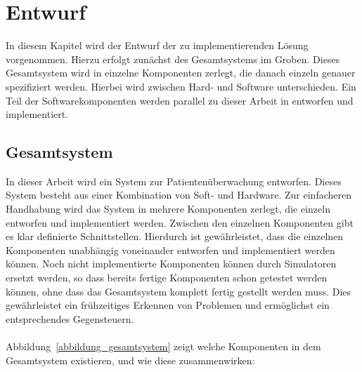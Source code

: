 

\chapter{Entwurf}\label{Entwurf}

In diesem Kapitel wird der Entwurf der zu implementierenden Lösung vorgenommen. Hierzu erfolgt zunächst des Gesamtsystems
im Groben. Dieses Gesamtsystem wird in einzelne Komponenten zerlegt, die danach einzeln genauer spezifiziert werden.
Hierbei wird zwischen Hard- und Software unterschieden. Ein Teil der Softwarekomponenten werden parallel zu dieser 
Arbeit in \cite{Jan} entworfen und implementiert.

\section{Gesamtsystem}
In dieser Arbeit wird ein System zur Patientenüberwachung entworfen. Dieses System besteht aus einer Kombination
von Soft- und Hardware. Zur einfacheren Handhabung wird das System in mehrere Komponenten zerlegt, die einzeln entworfen
und implementiert werden. Zwischen den einzelnen Komponenten gibt es klar definierte Schnittstellen. Hierdurch ist
gewährleistet, dass die einzelnen Komponenten unabhängig voneinander entworfen und implementiert werden können. Noch nicht
implementierte Komponenten können durch Simulatoren ersetzt werden, so dass bereits fertige Komponenten schon getestet
werden können, ohne dass das Gesamtsystem komplett fertig gestellt werden muss. Dies gewährleistet ein frühzeitiges
Erkennen von Problemen und ermöglichst ein entsprechendes Gegensteuern.\\
\\
Abbildung~\ref{abbildung_gesamtsystem} zeigt welche Komponenten in dem Gesamtsystem existieren, und wie diese
zusammenwirken:

